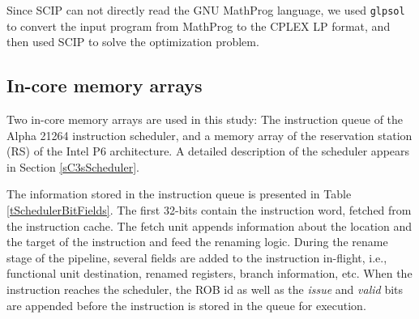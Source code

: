 \documentclass[12pt]{yalephd}
\begin{document}
Since SCIP can not directly read the GNU MathProg language, we used {\tt glpsol}\cite{makhorin2000modeling} to convert the input program from MathProg to the CPLEX LP format, and then used SCIP to solve the optimization problem.

\subsection{In-core memory arrays}\label{sC5sIncoreArrays}

Two in-core memory arrays are used in this study: The instruction queue of the Alpha 21264 instruction scheduler, and a memory array of the reservation station (RS) of the Intel P6 architecture. A detailed description of the scheduler appears in Section \ref{sC3sScheduler}.

The information stored in the instruction queue is presented in Table \ref{tSchedulerBitFields}. The first 32-bits contain the instruction word, fetched from the instruction cache. The fetch unit appends information about the location and the target of the instruction and feed the renaming logic. During the rename stage of the pipeline, several fields are added to the instruction in-flight, i.e., functional unit destination, renamed registers, branch information, etc. When the instruction reaches the scheduler, the ROB id as well as the {\em issue} and {\em valid} bits are appended before the instruction is stored in the queue for execution.
\end{document}
